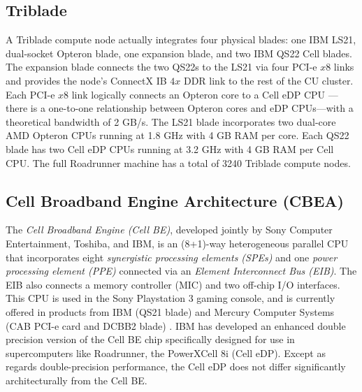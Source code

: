 \documentclass[letter,10pt]{article}
\begin{document}
\subsection{Triblade}


A Triblade compute node actually
integrates four physical blades: one IBM LS21, dual-socket Opteron
blade, one expansion blade, and two IBM QS22 Cell blades.  The
expansion blade connects the two QS22s to the LS21 via four PCI-e $x8$
links and provides the node's ConnectX IB $4x$ DDR link to the rest of
the CU cluster.  Each PCI-e $x8$ link logically connects an Opteron
core to a Cell eDP CPU ---there is a one-to-one relationship between
Opteron cores and eDP CPUs---with a theoretical bandwidth of 2 GB/s.
The LS21 blade incorporates two dual-core AMD Opteron CPUs running at
1.8 GHz with 4 GB RAM per core.  Each QS22 blade has two Cell eDP CPUs
running at 3.2 GHz with 4 GB RAM per Cell CPU.  The full Roadrunner
machine has a total of 3240 Triblade compute nodes.

\subsection{Cell Broadband Engine Architecture (CBEA)}


The \emph{Cell Broadband Engine (Cell BE)}, developed jointly by Sony
Computer Entertainment, Toshiba, and IBM, is an (8+1)-way
heterogeneous parallel CPU that incorporates eight
\emph{synergistic processing elements (SPEs)} and one
\emph{power processing element (PPE)} connected via an
\emph{Element Interconnect Bus (EIB)}.  The EIB also connects
a memory controller (MIC) and two off-chip I/O interfaces.  This CPU
is used in the Sony Playstation 3 gaming console, and is currently
offered in products from IBM (QS21 blade) and Mercury Computer Systems
(CAB PCI-e card and DCBB2 blade) \cite{mercury}.  IBM has developed an
enhanced double precision version of the Cell BE chip specifically
designed for use in supercomputers like Roadrunner, the PowerXCell 8i
(Cell eDP).  Except as regards double-precision performance, the Cell
eDP does not differ significantly architecturally from the Cell BE.
\end{document}
